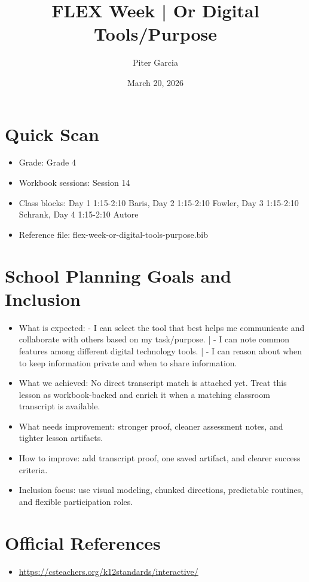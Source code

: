 \documentclass[11pt]{article}
\title{FLEX Week | Or Digital Tools/Purpose}
\author{Piter Garcia}
\date{March 20, 2026}
\begin{document}
\maketitle
\section*{Quick Scan}
\begin{itemize}[leftmargin=*]
\item Grade: Grade 4
\item Workbook sessions: Session 14
\item Class blocks: Day 1 1:15-2:10 Baris, Day 2 1:15-2:10 Fowler, Day 3 1:15-2:10 Schrank, Day 4 1:15-2:10 Autore
\item Reference file: flex-week-or-digital-tools-purpose.bib
\end{itemize}
\section*{School Planning Goals and Inclusion}
\begin{itemize}[leftmargin=*]
\item What is expected: - I can select the tool that best helps me communicate and collaborate with others based on my task/purpose. | - I can note common features among different digital technology tools. | - I can reason about when to keep information private and when to share information.
\item What we achieved: No direct transcript match is attached yet. Treat this lesson as workbook-backed and enrich it when a matching classroom transcript is available.
\item What needs improvement: stronger proof, cleaner assessment notes, and tighter lesson artifacts.
\item How to improve: add transcript proof, one saved artifact, and clearer success criteria.
\item Inclusion focus: use visual modeling, chunked directions, predictable routines, and flexible participation roles.
\end{itemize}
\section*{Official References}
\begin{itemize}[leftmargin=*]
\item \url{https://csteachers.org/k12standards/interactive/}

\end{itemize}
\end{document}
